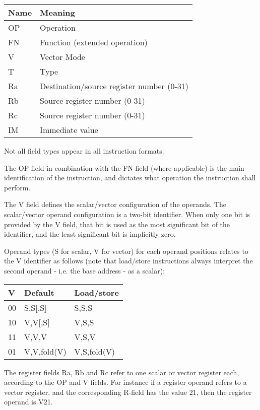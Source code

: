 \begin{tabular}{|l|l|}
  \hline
  \textbf{Name} & \textbf{Meaning} \\
  \hline
  OP & Operation \\
  \hline
  FN & Function (extended operation) \\
  \hline
  V  & Vector Mode \\
  \hline
  T  & Type \\
  \hline
  Ra & Destination/source register number (0-31) \\
  \hline
  Rb & Source register number (0-31) \\
  \hline
  Rc & Source register number (0-31) \\
  \hline
  IM & Immediate value \\
  \hline
\end{tabular}

Not all field types appear in all instruction formats.

The OP field in combination with the FN field (where applicable) is the main
identification of the instruction, and dictates what operation the instruction
shall perform.

The V field defines the scalar/vector configuration of the operands. The
scalar/vector operand configuration is a two-bit identifier. When only one bit
is provided by the V field, that bit is used as the most significant bit of the
identifier, and the least significant bit is implicitly zero.

Operand types (S for scalar, V for vector) for each operand positions relates
to the V identifier as follows (note that load/store instructions always
interpret the second operand - i.e. the base address - as a scalar):

\begin{tabular}{|l|l|l|}
  \hline
  \textbf{V} & \textbf{Default} & \textbf{Load/store} \\
  \hline
  00 & S,S[,S] & S,S,S \\
  \hline
  10 & V,V[,S] & V,S,S \\
  \hline
  11 & V,V,V & V,S,V \\
  \hline
  01 & V,V,fold(V) & V,S,fold(V) \\
  \hline
\end{tabular}

The register fields Ra, Rb and Rc refer to one scalar or vector register each,
according to the OP and V fields. For instance if a register operand refers to
a vector register, and the corresponding R-field has the value 21, then the
register operand is V21.

